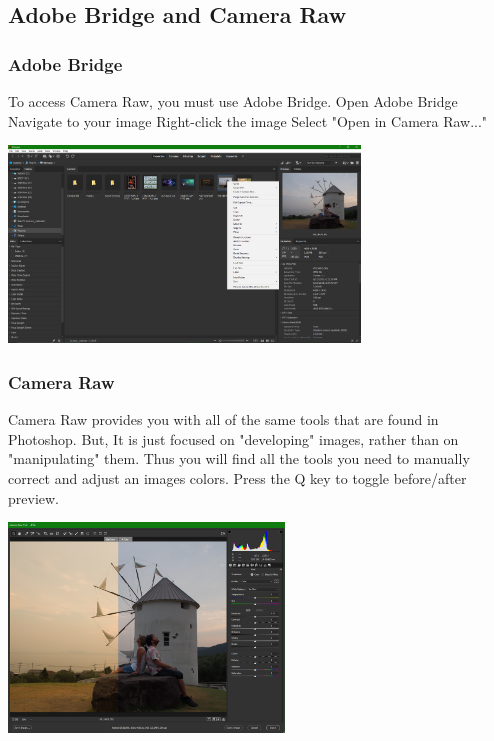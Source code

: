 \documentclass{beamer}
\begin{document}
			\subsection{Adobe Bridge and Camera Raw}				
				\begin{frame}
					\frametitle{Adobe Bridge}
					\begin{outline}
						\1 To access Camera Raw, you must use Adobe Bridge.
						\1 Open Adobe Bridge
						\2 Navigate to your image
						\2 Right-click the image
						\2 Select "Open in Camera Raw..."
					\end{outline}
				\begin{center}
					\includegraphics[width=0.7\textwidth]{images/bridge.png}
					\end{center}
				\end{frame}
	
	\begin{frame}
		\frametitle{Camera Raw}
		\begin{outline}
			\1 Camera Raw provides you with all of the same tools that are found in Photoshop.
			\1 But, It is just focused on "developing" images, rather than on "manipulating" them.
			\1 Thus you will find all the tools you need to manually correct and adjust an images colors.
			\1 Press the Q key to toggle before/after preview.
		\end{outline}
	\begin{center}
		\includegraphics[width=0.55\textwidth]{images/camera raw.png}
	\end{center}
	\end{frame}	
\end{document}
